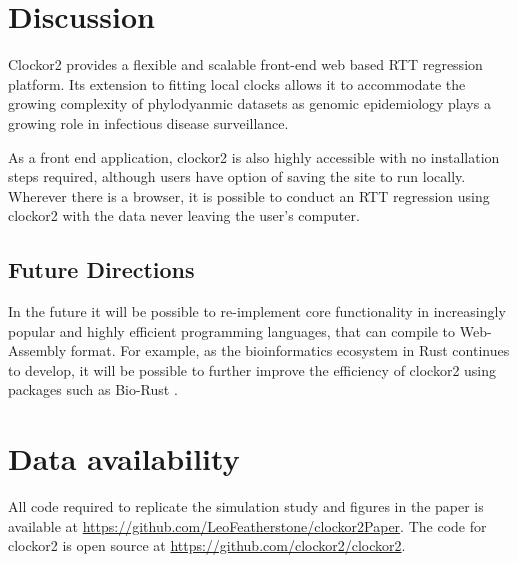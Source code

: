 \documentclass{article}
\begin{document}
\section*{Discussion}
Clockor2 provides a flexible and scalable front-end web based RTT regression platform. Its extension to fitting local clocks allows it to accommodate the growing complexity of phylodyanmic datasets as genomic epidemiology plays a growing role in infectious disease surveillance. 

As a front end application, clockor2 is also highly accessible with no installation steps required, although users have option of saving the site to run locally. Wherever there is a browser, it is possible to conduct an RTT regression using clockor2 with the data never leaving the user's computer.

\subsection*{Future Directions}
In the future it will be possible to re-implement core functionality in increasingly popular and highly efficient programming languages, that can compile to Web-Assembly format. For example, as the bioinformatics ecosystem in Rust continues to develop, it will be possible to further improve the efficiency of clockor2 using packages such as Bio-Rust \citep{koester_rust-bio-2015}.


\section*{Data availability}
All code required to replicate the simulation study and figures in the paper is available at \url{https://github.com/LeoFeatherstone/clockor2Paper}. The code for clockor2 is open source at \url{https://github.com/clockor2/clockor2}.


\end{document}
